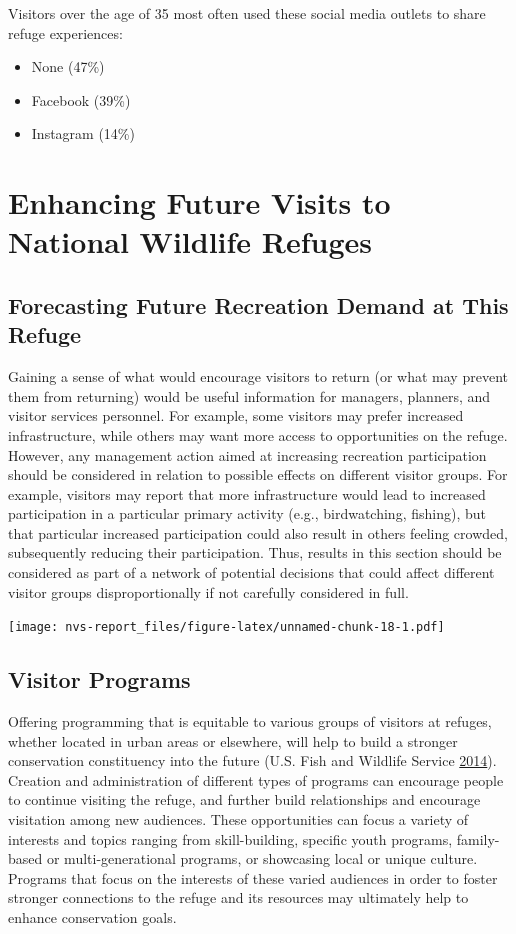 \documentclass[]{book}
\providecommand{\tightlist}{%
  \setlength{\itemsep}{0pt}\setlength{\parskip}{0pt}}
\begin{document}
Visitors over the age of 35 most often used these social media outlets
to share refuge experiences:

\begin{itemize}
\tightlist
\item
  None (47\%)
\item
  Facebook (39\%)
\item
  Instagram (14\%)
\end{itemize}

\chapter{Enhancing Future Visits to National Wildlife
Refuges}\label{futvis}

\section{Forecasting Future Recreation Demand at This
Refuge}\label{forecasting-future-recreation-demand-at-this-refuge}

Gaining a sense of what would encourage visitors to return (or what may
prevent them from returning) would be useful information for managers,
planners, and visitor services personnel. For example, some visitors may
prefer increased infrastructure, while others may want more access to
opportunities on the refuge. However, any management action aimed at
increasing recreation participation should be considered in relation to
possible effects on different visitor groups. For example, visitors may
report that more infrastructure would lead to increased participation in
a particular primary activity (e.g., birdwatching, fishing), but that
particular increased participation could also result in others feeling
crowded, subsequently reducing their participation. Thus, results in
this section should be considered as part of a network of potential
decisions that could affect different visitor groups disproportionally
if not carefully considered in full.

\texttt{[image: nvs-report\_files/figure-latex/unnamed-chunk-18-1.pdf]}

\section{Visitor Programs}\label{visitor-programs}

Offering programming that is equitable to various groups of visitors at
refuges, whether located in urban areas or elsewhere, will help to build
a stronger conservation constituency into the future (U.S. Fish and
Wildlife Service \protect\hyperlink{ref-USFWS2014}{2014}). Creation and
administration of different types of programs can encourage people to
continue visiting the refuge, and further build relationships and
encourage visitation among new audiences. These opportunities can focus
a variety of interests and topics ranging from skill-building, specific
youth programs, family-based or multi-generational programs, or
showcasing local or unique culture. Programs that focus on the interests
of these varied audiences in order to foster stronger connections to the
refuge and its resources may ultimately help to enhance conservation
goals.
\end{document}
